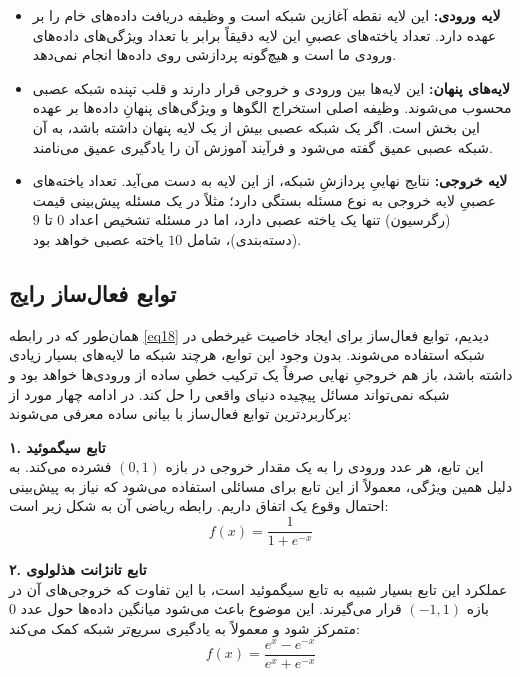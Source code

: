 \begin{itemize}
	\item \textbf{لایه ورودی:} این لایه نقطه آغازین شبکه است و وظیفه دریافت داده‌های خام را بر عهده دارد. تعداد یاخته‌های عصبیِ این لایه دقیقاً برابر با تعداد ویژگی‌های داده‌های ورودی ما است و هیچ‌گونه پردازشی روی داده‌ها انجام نمی‌دهد.
	
	\item \textbf{لایه‌های پنهان:} این لایه‌ها بین ورودی و خروجی قرار دارند و قلب تپنده شبکه عصبی محسوب می‌شوند. وظیفه اصلی استخراج الگوها و ویژگی‌های پنهانِ داده‌ها بر عهده این بخش است. اگر یک شبکه عصبی بیش از یک لایه پنهان داشته باشد، به آن شبکه عصبی عمیق گفته می‌شود و فرآیند آموزش آن را یادگیری عمیق می‌نامند.
	
	\item \textbf{لایه خروجی:} نتایج نهاییِ پردازشِ شبکه، از این لایه به دست می‌آید. تعداد یاخته‌های عصبیِ لایه خروجی به نوع مسئله بستگی دارد؛ مثلاً در یک مسئله پیش‌بینی قیمت (رگرسیون) تنها یک یاخته عصبی دارد، اما در مسئله تشخیص اعداد $0$ تا $9$ (دسته‌بندی)، شامل $10$ یاخته عصبی خواهد بود.
\end{itemize}

\subsection{توابع فعال‌ساز رایج}\label{subsec:4-3-2}
همان‌طور که در رابطه \eqref{eq18} دیدیم، توابع فعال‌ساز برای ایجاد خاصیت غیرخطی در شبکه استفاده می‌شوند. بدون وجود این توابع، هرچند شبکه ما لایه‌های بسیار زیادی داشته باشد، باز هم خروجیِ نهایی صرفاً یک ترکیب خطیِ ساده از ورودی‌ها خواهد بود و شبکه نمی‌تواند مسائل پیچیده دنیای واقعی را حل کند. در ادامه چهار مورد از پرکاربردترین توابع فعال‌ساز با بیانی ساده معرفی می‌شوند:

\textbf{۱. تابع سیگموئید } \\
این تابع، هر عدد ورودی را به یک مقدار خروجی در بازه $(0, 1)$ فشرده می‌کند. به دلیل همین ویژگی، معمولاً از این تابع برای مسائلی استفاده می‌شود که نیاز به پیش‌بینی احتمال وقوع یک اتفاق داریم. رابطه ریاضی آن به شکل زیر است:
\begin{equation} \label{eq19}
	f(x) = \frac{1}{1 + e^{-x}}
\end{equation}

\textbf{۲. تابع تانژانت هذلولوی} \\
عملکرد این تابع بسیار شبیه به تابع سیگموئید است، با این تفاوت که خروجی‌های آن در بازه $(-1, 1)$ قرار می‌گیرند. این موضوع باعث می‌شود میانگین داده‌ها حول عدد $0$ متمرکز شود و معمولاً به یادگیری سریع‌تر شبکه کمک می‌کند:
\begin{equation} \label{eq20}
	f(x) = \frac{e^x - e^{-x}}{e^x + e^{-x}}
\end{equation}

